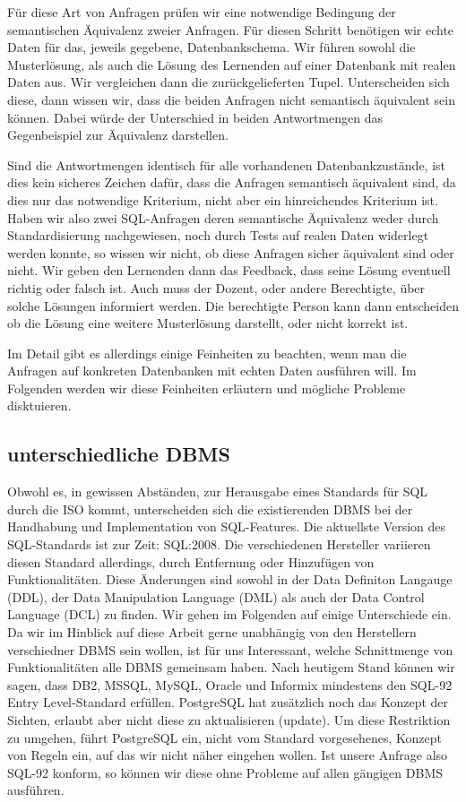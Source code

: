 Für diese Art von Anfragen prüfen wir eine notwendige Bedingung der semantischen Äquivalenz zweier Anfragen. Für diesen Schritt benötigen wir echte Daten für das, jeweils gegebene, Datenbankschema. Wir führen sowohl die Musterlösung, als auch die Lösung des Lernenden auf einer Datenbank mit realen Daten aus. Wir vergleichen dann die zurückgelieferten Tupel. Unterscheiden sich diese, dann wissen wir, dass die beiden Anfragen nicht semantisch äquivalent sein können. Dabei würde der Unterschied in beiden Antwortmengen das Gegenbeispiel zur Äquivalenz darstellen.

Sind die Antwortmengen identisch für alle vorhandenen Datenbankzustände, ist dies kein sicheres Zeichen dafür, dass die Anfragen semantisch äquivalent sind, da dies nur das notwendige Kriterium, nicht aber ein hinreichendes Kriterium ist. Haben wir also zwei SQL-Anfragen deren semantische Äquivalenz weder durch Standardisierung nachgewiesen, noch durch Tests auf realen Daten widerlegt werden konnte, so wissen wir nicht, ob diese Anfragen sicher äquivalent sind oder nicht. Wir geben den Lernenden dann das Feedback, dass seine Lösung eventuell richtig oder falsch ist. Auch muss der Dozent, oder andere Berechtigte, über solche Lösungen informiert werden. Die berechtigte Person kann dann entscheiden ob die Lösung eine weitere Musterlösung darstellt, oder nicht korrekt ist.

Im Detail gibt es allerdings einige Feinheiten zu beachten, wenn man die Anfragen auf konkreten Datenbanken mit echten Daten ausführen will. Im Folgenden werden wir diese Feinheiten erläutern und mögliche Probleme disktuieren.

\subsection{unterschiedliche DBMS}

Obwohl es, in gewissen Abständen, zur Herausgabe eines Standards für SQL durch die ISO kommt, unterscheiden sich die existierenden DBMS bei der Handhabung und Implementation von SQL-Features. Die aktuellste Version des SQL-Standards ist zur Zeit: SQL:2008. Die verschiedenen Hersteller variieren diesen Standard allerdings, durch Entfernung oder Hinzufügen von Funktionalitäten. Diese Änderungen sind sowohl in der Data Definiton Langauge (DDL), der Data Manipulation Language (DML) als auch der Data Control Language (DCL) zu finden. Wir gehen im Folgenden auf einige Unterschiede ein. Da wir im Hinblick auf diese Arbeit gerne unabhängig von den Herstellern verschiedner DBMS sein wollen, ist für uns Interessant, welche Schnittmenge von Funktionalitäten alle DBMS gemeinsam haben. Nach heutigem Stand können wir sagen, dass DB2, MSSQL, MySQL, Oracle und Informix mindestens den SQL-92 Entry Level-Standard erfüllen. PostgreSQL hat zusätzlich noch das Konzept der Sichten, erlaubt aber nicht diese zu aktualisieren (update). Um diese Restriktion zu umgehen, führt PostgreSQL ein, nicht vom Standard vorgesehenes, Konzept von Regeln ein, auf das wir nicht näher eingehen wollen. Ist unsere Anfrage also SQL-92 konform, so können wir diese ohne Probleme auf allen gängigen DBMS ausführen.

